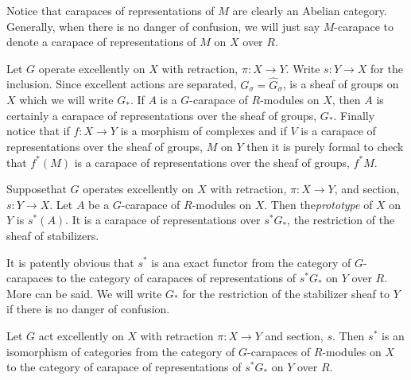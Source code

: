 Notice that carapaces of representations of $M$ are clearly an Abelian category. Generally, when there is no danger of confusion, we will just say $M$-carapace to denote a carapace of representations of $M$ on $X$ over $R$.

Let $G$ operate excellently on $X$ with retraction, $\pi : X\rightarrow Y$. Write $s : Y \rightarrow X$ for the inclusion. Since excellent actions are separated, $G_{\sigma} = \hat{G}_{\sigma}$, is a sheaf of groups on $X$ which we will write $G_{*}$. If $A$ is a $G$-carapace of $R$-modules on $X$, then $A$ is certainly a carapace of representations over the sheaf of groups, $G_{*}$. Finally notice that if $f : X\rightarrow Y$ is a morphism of complexes and if $V$ is a carapace of representations over the sheaf of groups, $M$ on $Y$ then it is purely formal to check that $f^{*}(M)$ is a carapace of representations over the sheaf of groups, $f^{*}M$.

\begin{definition}\label{chap6-definition-9.11}
Suppose\pageoriginale that $G$ operates excellently on $X$ with retraction, $\pi : X\rightarrow Y$, and section, $s: Y \rightarrow X$. Let $A$ be a $G$-carapace of $R$-modules on $X$. Then the\textit{prototype} of $X$ on $Y$ is $s^{*}(A)$. It is a carapace of representations over $s^{*}G_{*}$, the restriction of the sheaf of stabilizers.
\end{definition}

It is patently obvious that $s^{*}$ is ana exact functor from the category of $G$-carapaces to the category of carapaces of representations of $s^{*}G_{*}$ on $Y$ over $R$. More can be said. We will write $G_{*}$ for the restriction of the stabilizer sheaf to $Y$ if there is no danger of confusion.

\begin{secthm}\label{chap6-thm-9.12}
Let $G$ act excellently on $X$ with retraction $\pi : X\rightarrow Y$ and section, $s$. Then $s^{*}$ is an isomorphism of categories from the category of $G$-carapaces of $R$-modules on $X$ to the category of carapace of representations of $s^{*}G_{*}$ on $Y$ over $R$.
\end{secthm}

